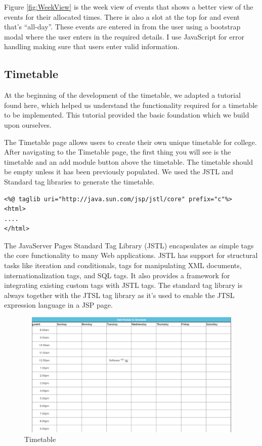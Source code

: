 Figure \ref{fig:WeekView} is the week view of events that shows a better view of the events for their allocated times. There is also a slot at the top for and event that’s “all-day”. These events are entered in from the user using a bootstrap modal where the user enters in the required details. I use JavaScript for error handling making sure that users enter valid information. 

\subsection{Timetable}
At the beginning of the development of the timetable, we adapted a tutorial found here\cite{Timetable}, which helped us understand the functionality required for a timetable to be implemented. This tutorial provided the basic foundation which we build upon ourselves. \par
The Timetable page allows users to create their own unique timetable for college. After navigating to the Timetable page, the first thing you will see is the timetable and an add module button above the timetable. The timetable should be empty unless it has been previously populated. We used the JSTL and Standard tag libraries to generate the timetable. 

\begin{verbatim}
<%@ taglib uri="http://java.sun.com/jsp/jstl/core" prefix="c"%>
<html>
....
</html>
\end{verbatim}

The JavaServer Pages Standard Tag Library (JSTL) encapsulates as simple tags the core functionality to many Web applications. JSTL has support for structural tasks like iteration and conditionals, tags for manipulating XML documents, internationalization tags, and SQL tags. It also provides a framework for integrating existing custom tags with JSTL tags\cite{JSTL}. The standard tag library is always together with the JTSL tag library as it's used to enable the JTSL expression language in a JSP page.

\begin{figure}[h]
\centering
\includegraphics[width=12cm, height=6cm]{img/timetable}
\caption{Timetable}
\label{fig:timetable}
\end{figure}


